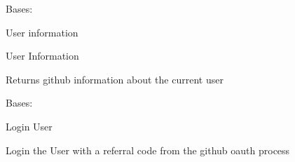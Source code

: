 \documentclass[letterpaper,10pt,english]{sphinxmanual}
\begin{document}
\begin{fulllineitems}
\label{_source/son_editor.apis:son_editor.apis.userserviceapi.Information}
Bases: 

User information

\begin{fulllineitems}
\label{_source/son_editor.apis:son_editor.apis.userserviceapi.Information.get}
User Information

Returns github information about the current user

\end{fulllineitems}


\begin{fulllineitems}
\label{_source/son_editor.apis:son_editor.apis.userserviceapi.Information.methods}
\end{fulllineitems}


\end{fulllineitems}


\begin{fulllineitems}
\label{_source/son_editor.apis:son_editor.apis.userserviceapi.Login}
Bases: 

\begin{fulllineitems}
\label{_source/son_editor.apis:son_editor.apis.userserviceapi.Login.get}
Login User

Login the User with a referral code from the github oauth process

\end{fulllineitems}


\begin{fulllineitems}
\label{_source/son_editor.apis:son_editor.apis.userserviceapi.Login.methods}
\end{fulllineitems}


\end{fulllineitems}
\end{document}
